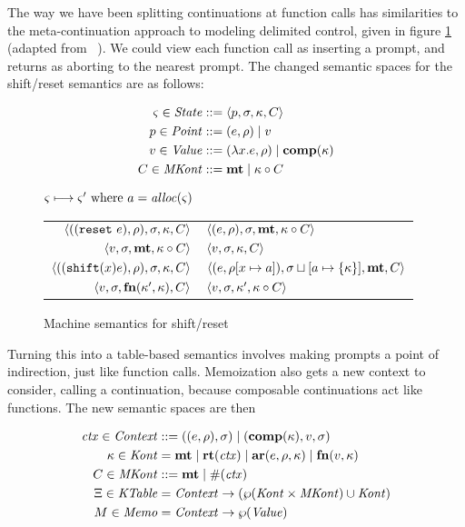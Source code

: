 \documentclass{llncs}
\begin{document}
The way we have been splitting continuations at function calls has
similarities to the meta-continuation approach to modeling delimited
control, given in figure \ref{fig:shift-reset} (adapted from
~\citep{ianjohnson:Biernacki2006274}). We could view each function
call as inserting a prompt, and returns as aborting to the nearest
prompt. The changed semantic spaces for the shift/reset semantics are as
follows:

\begin{align*}
  \varsigma \in \mathit{State} &::= \langle p, \sigma, \kappa, C \rangle \\
  p \in \mathit{Point} &::= (e, \rho) \mid v \\
  v \in \mathit{Value} &::= (\lambda{} x. e, \rho) \mid \mathbf{comp}(\kappa) \\
  C \in \mathit{MKont} &::= \mathbf{mt} \mid \kappa\circ C
\end{align*}

\begin{figure}
  \centering
  $\varsigma \longmapsto \varsigma' \text{ where } a = \mathit{alloc}(\varsigma)$ \\
  \begin{tabular}{r|l}
    \hline
    $\langle ((\texttt{reset}\ e), \rho), \sigma, \kappa, C \rangle$
    &
    $\langle (e, \rho), \sigma, \mathbf{mt}, \kappa\circ C \rangle$
    \\
    $\langle v, \sigma, \mathbf{mt}, \kappa\circ C \rangle$
    &
    $\langle v, \sigma, {\kappa}, {C} \rangle$
    \\
    $\langle ((\texttt{shift} (x) e), \rho), \sigma, \kappa, C \rangle$
    &
    $\langle (e, \rho[x \mapsto a]), \sigma\sqcup[a \mapsto \{ \kappa \}],\mathbf{mt},C \rangle$
    \\
    $\langle v,\sigma,\mathbf{fn}{}(\kappa', \kappa), C \rangle$
    &
    $\langle v, \sigma, \kappa', \kappa\circ C \rangle$
  \end{tabular}  
  \caption{Machine semantics for shift/reset}
  \label{fig:shift-reset}
\end{figure}

Turning this into a table-based semantics involves making prompts a
point of indirection, just like function calls. Memoization also gets
a new context to consider, calling a continuation, because composable
continuations act like functions. The new semantic spaces are then

\begin{align*}
  \mathit{ctx} \in \mathit{Context} &::= ((e,\rho),\sigma) \mid (\mathbf{comp}(\kappa),v,\sigma) \\
  \kappa \in \mathit{Kont} &= \mathbf{mt} \mid \mathbf{rt}(\mathit{ctx}) \mid \mathbf{ar}{}(e,\rho,\kappa) \mid \mathbf{fn}{}(v,\kappa) \\
  C \in \mathit{MKont} &::= \mathbf{mt} \mid \#(\mathit{ctx}) \\
  \Xi \in \mathit{KTable} &= \mathit{Context} \to (\wp(\mathit{Kont} \times \mathit{MKont}) \cup \mathit{Kont}) \\
  M \in \mathit{Memo} &= \mathit{Context} \to \wp(\mathit{Value})
\end{align*}
\end{document}
